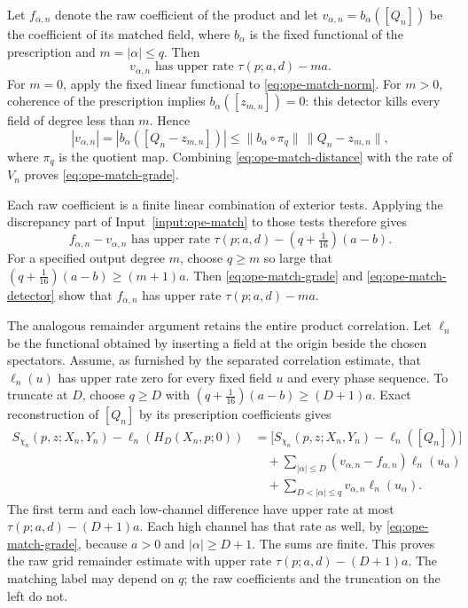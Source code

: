 Let $f_{\alpha,n}$ denote the raw coefficient of the product and let
$v_{\alpha,n}=b_\alpha([Q_n])$ be the coefficient of its matched field,
where $b_\alpha$ is the fixed functional of the prescription and
$m=|\alpha|\leq q$. Then
\begin{equation}\label{eq:ope-match-grade}
 v_{\alpha,n}\text{ has upper rate }\tau(p;a,d)-ma.
\end{equation}
For $m=0$, apply the fixed linear functional to
\eqref{eq:ope-match-norm}. For $m>0$, coherence of the prescription
implies $b_\alpha([z_{m,n}])=0$: this detector kills every field of degree
less than $m$. Hence
\[
 |v_{\alpha,n}|=|b_\alpha([Q_n-z_{m,n}])|
       \leq \|b_\alpha\circ\pi_q\|\,\|Q_n-z_{m,n}\|,
\]
where $\pi_q$ is the quotient map. Combining
\eqref{eq:ope-match-distance} with the rate of $V_n$ proves
\eqref{eq:ope-match-grade}.

Each raw coefficient is a finite linear combination of exterior tests.
Applying the discrepancy part of Input~\ref{input:ope-match} to those
tests therefore gives
\begin{equation}\label{eq:ope-match-detector}
 f_{\alpha,n}-v_{\alpha,n}\text{ has upper rate }
                  \tau(p;a,d)-(q+\tfrac1{16})(a-b).
\end{equation}
For a specified output degree $m$, choose $q\geq m$ so large that
$(q+\tfrac1{16})(a-b)\geq(m+1)a$. Then
\eqref{eq:ope-match-grade} and \eqref{eq:ope-match-detector} show that
$f_{\alpha,n}$ has upper rate $\tau(p;a,d)-ma$.

The analogous remainder argument retains the entire product correlation.
Let $\ell_n$ be the functional obtained by inserting a field at the origin
beside the chosen spectators. Assume, as furnished by the separated
correlation estimate, that $\ell_n(u)$ has upper rate zero for every fixed
field $u$ and every phase sequence. To truncate at $D$, choose $q\geq D$
with $(q+\tfrac1{16})(a-b)\geq(D+1)a$. Exact reconstruction of $[Q_n]$
by its prescription coefficients gives
\begin{align}
 S_{\chi_n}(p,z;X_n,Y_n)-\ell_n(H_D(X_n,p;0))
 &=\bigl[S_{\chi_n}(p,z;X_n,Y_n)-\ell_n([Q_n])\bigr]\nonumber\\
 &\quad+\sum_{|\alpha|\leq D}(v_{\alpha,n}-f_{\alpha,n})
                            \ell_n(u_\alpha)\nonumber\\
 &\quad+\sum_{D<|\alpha|\leq q}v_{\alpha,n}\ell_n(u_\alpha).
 \label{eq:ope-match-remainder}
\end{align}
The first term and each low-channel difference have upper rate at most
$\tau(p;a,d)-(D+1)a$. Each high channel has that rate as well, by
\eqref{eq:ope-match-grade}, because $a>0$ and $|\alpha|\geq D+1$.
The sums are finite. This proves the raw grid remainder estimate with
upper rate $\tau(p;a,d)-(D+1)a$. The matching label may depend on $q$;
the raw coefficients and the truncation on the left do not.

